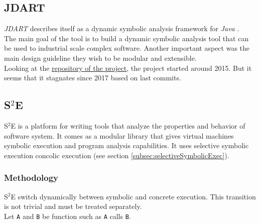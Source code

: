 \documentclass[11pt]{IEEEtran}
\begin{document}
	\subsection{JDART}
		\emph{JDART} describes itself as a dynamic symbolic analysis framework for \emph{Java} \cite{jDart}.\\
		The main goal of the tool is to build a dynamic symbolic analysis tool that can be used to industrial scale complex software. Another important aspect was the main design guideline they wish to be modular and extensible.\\


		Looking at the \href{https://github.com/psycopaths/jdart}{repository of the project}, the project started around 2015. But it seems that it stagnates since 2017 based on last commits.


	\subsection{S$^2$E}
    \label{subsec:S2E}
    	S$^2$E is a platform for writing tools that analyze the properties and behavior of software system. It comes as a modular library that gives virtual machines symbolic execution and program analysis capabilities.\cite{S2EWebSite} It uses selective symbolic execution concolic execution (see section  \ref{subsec:selectiveSymbolicExec}).



    	\subsubsection{Methodology}
    		S$^2$E switch dynamically between symbolic and concrete execution. This transition is not trivial and must be treated separately.\\
    		Let \texttt{A} and \texttt{B} be function such as \texttt{A} calls \texttt{B}.\\
\end{document}
